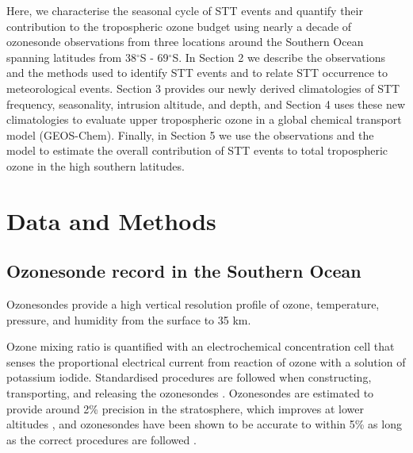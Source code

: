 \documentclass{article}
\begin{document}


    Here, we characterise the seasonal cycle of STT events and quantify their contribution to the tropospheric ozone budget using nearly a decade of ozonesonde observations from three locations around the Southern Ocean spanning latitudes from 38$^{\circ}$S - 69$^{\circ}$S. 
    In Section 2 we describe the observations and the methods used to identify STT events and to relate STT occurrence to meteorological events.
    Section 3 provides our newly derived climatologies of STT frequency, seasonality, intrusion altitude, and depth, and Section 4 uses these new climatologies to evaluate upper tropospheric ozone in a global chemical transport model (GEOS-Chem). 
    Finally, in Section 5 we use the observations and the model to estimate the overall contribution of STT events to total tropospheric ozone in the high southern latitudes.

\section{Data and Methods}

  \subsection{Ozonesonde record in the Southern Ocean}
  \label{Section:ozonesondes}
    Ozonesondes provide a high vertical resolution profile of ozone, temperature, pressure, and humidity from the surface to 35 km.
    
    Ozone mixing ratio is quantified with an electrochemical concentration cell that senses the proportional electrical current from reaction of ozone with a solution of potassium iodide.
    Standardised procedures are followed when constructing, transporting, and releasing the ozonesondes \citep{noaasondes}.
    Ozonesondes are estimated to provide around 2\% precision in the stratosphere, which improves at lower altitudes \citep{noaasondes}, and ozonesondes have been shown to be accurate to within 5\% as long as the correct procedures are followed \citep{Smit2007}.
    
\end{document}
